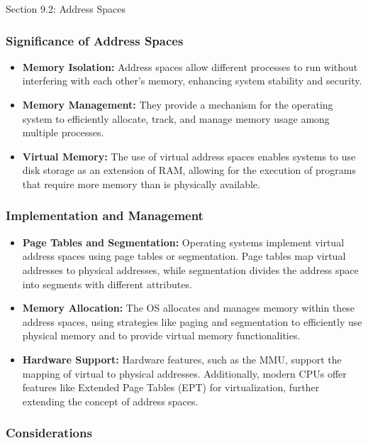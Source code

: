 \begin{notes}{Section 9.2: Address Spaces}
    \subsubsection*{Significance of Address Spaces}
    
    \begin{itemize}
        \item \textbf{Memory Isolation:} Address spaces allow different processes to run without interfering with each other's memory, enhancing system stability and security.
        \item \textbf{Memory Management:} They provide a mechanism for the operating system to efficiently allocate, track, and manage memory usage among multiple processes.
        \item \textbf{Virtual Memory:} The use of virtual address spaces enables systems to use disk storage as an extension of RAM, allowing for the execution of programs that require more memory 
        than is physically available.
    \end{itemize}
    
    \subsubsection*{Implementation and Management}
    
    \begin{itemize}
        \item \textbf{Page Tables and Segmentation:} Operating systems implement virtual address spaces using page tables or segmentation. Page tables map virtual addresses to physical addresses, while 
        segmentation divides the address space into segments with different attributes.
        \item \textbf{Memory Allocation:} The OS allocates and manages memory within these address spaces, using strategies like paging and segmentation to efficiently use physical memory and to 
        provide virtual memory functionalities.
        \item \textbf{Hardware Support:} Hardware features, such as the MMU, support the mapping of virtual to physical addresses. Additionally, modern CPUs offer features like Extended Page Tables 
        (EPT) for virtualization, further extending the concept of address spaces.
    \end{itemize}
    
    \subsubsection*{Considerations}
    

\end{notes}
